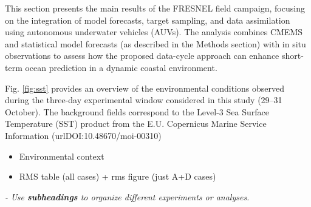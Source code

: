 \begin{figure}
  \centering {}
\end{figure}

This section presents the main results of the FRESNEL field campaign,
focusing on the integration of model forecasts, target sampling, and
data assimilation using autonomous underwater vehicles (AUVs). The
analysis combines CMEMS and statistical model forecasts (as described
in the Methods section) with in situ observations to assess how the
proposed data-cycle approach can enhance short-term ocean prediction
in a dynamic coastal environment.

Fig. \ref{fig:sst} provides an overview of the environmental
conditions observed during the three-day experimental window
considered in this study (29–31 October). The background fields
correspond to the Level-3 Sea Surface Temperature (SST) product from
the E.U. Copernicus Marine Service Information
(url{DOI:10.48670/moi-00310})


\begin{itemize}
    \item Environmental context
    \item RMS table (all cases) + rms figure (just A+D cases)
\end{itemize}

 
\textit{- Use \textbf{subheadings} to organize different experiments or analyses.}
